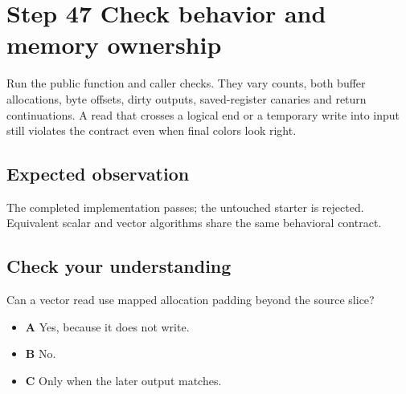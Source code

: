 \section{Step 47 Check behavior and memory ownership}\label{rgb-s47}

Run the public function and caller checks. They vary counts, both buffer allocations, byte offsets, dirty outputs, saved-register canaries and return continuations. A read that crosses a logical end or a temporary write into input still violates the contract even when final colors look right.

\subsection{Expected observation}
The completed implementation passes; the untouched starter is rejected. Equivalent scalar and vector algorithms share the same behavioral contract.

\subsection{Check your understanding}
Can a vector read use mapped allocation padding beyond the source slice?

\begin{itemize}
  \item \textbf{A} Yes, because it does not write.
  \item \textbf{B} No.
  \item \textbf{C} Only when the later output matches.
\end{itemize}
